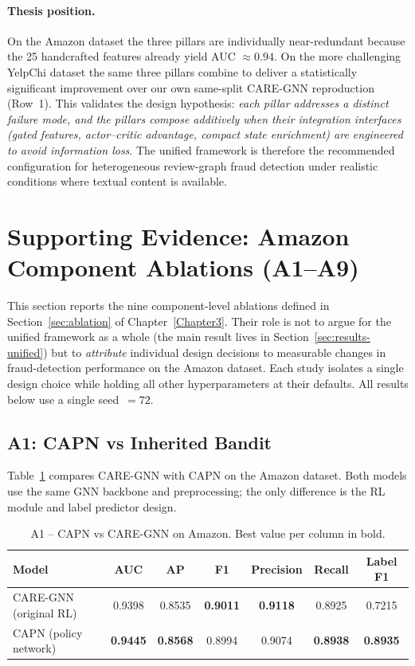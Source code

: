\paragraph{Thesis position.} On the Amazon dataset the three pillars are individually near-redundant because the 25 handcrafted features already yield AUC $\approx 0.94$. On the more challenging YelpChi dataset the same three pillars combine to deliver a statistically significant improvement over our own same-split CARE-GNN reproduction (Row~1). This validates the design hypothesis: \emph{each pillar addresses a distinct failure mode, and the pillars compose additively when their integration interfaces (gated features, actor--critic advantage, compact state enrichment) are engineered to avoid information loss}. The unified framework is therefore the recommended configuration for heterogeneous review-graph fraud detection under realistic conditions where textual content is available.


\section{Supporting Evidence: Amazon Component Ablations (A1--A9)}
\label{sec:amazon-ablations}

This section reports the nine component-level ablations defined in Section~\ref{sec:ablation} of Chapter~\ref{Chapter3}. Their role is not to argue for the unified framework as a whole (the main result lives in Section~\ref{sec:results-unified}) but to \emph{attribute} individual design decisions to measurable changes in fraud-detection performance on the Amazon dataset. Each study isolates a single design choice while holding all other hyperparameters at their defaults. All results below use a single seed~$=72$.

\subsection{A1: CAPN vs Inherited Bandit}
\label{sec:results-a1}

Table~\ref{tab:capn-main-results} compares CARE-GNN with CAPN on the Amazon dataset. Both models use the same GNN backbone and preprocessing; the only difference is the RL module and label predictor design.

\begin{table}[h!]
\centering
\begin{tabular}{lcccccc}
\toprule
\textbf{Model} & \textbf{AUC} & \textbf{AP} & \textbf{F1} & \textbf{Precision} & \textbf{Recall} & \textbf{Label F1} \\
\midrule
CARE-GNN (original RL) & 0.9398 & 0.8535 & \textbf{0.9011} & \textbf{0.9118} & 0.8925 & 0.7215 \\
CAPN (policy network)  & \textbf{0.9445} & \textbf{0.8568} & 0.8994 & 0.9074 & \textbf{0.8938} & \textbf{0.8935} \\
\bottomrule
\end{tabular}
\caption{A1 -- CAPN vs CARE-GNN on Amazon. Best value per column in bold.}
\label{tab:capn-main-results}
\end{table}


